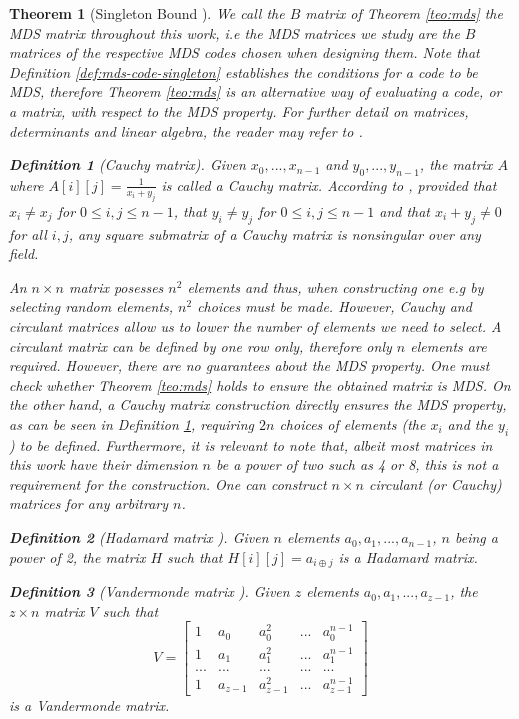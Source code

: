 \documentclass{report}
\newtheorem{definition}{Definition}{\bfseries}{\itshape}
\newtheorem{theorem}{Theorem}{\bfseries}{\itshape}
\begin{document}
\begin{theorem}[Singleton Bound \cite{SloaneBook}]
We call the $B$ matrix of Theorem \ref{teo:mds} the \emph{MDS matrix} throughout this work, i.e the MDS matrices we study are the $B$ matrices of the respective MDS codes chosen when designing them.
Note that Definition \ref{def:mds-code-singleton} establishes the conditions for a code to be MDS, therefore Theorem \ref{teo:mds} is an alternative way of evaluating a code, or a matrix, with respect to the MDS property.
For further detail on matrices, determinants and linear algebra, the reader may refer to \cite{LangeLinearAlgebra}.

\begin{definition}[Cauchy matrix]\label{def:cauchy}
Given $x_0, ..., x_{n-1}$ and $y_0, ..., y_{n-1}$, the matrix $A$ where $A[i][j] = \frac{1}{x_i + y_j}$ is called a Cauchy matrix. According to \cite{Youssef1997}, provided that $x_i \neq x_j$ for $0\leq i,j\leq n-1$, that $y_i \neq y_j$ for $0\leq i,j\leq n-1$ and that $x_i + y_j \neq 0$ for all $i, j$, any square submatrix of a Cauchy matrix is nonsingular over any field.
\end{definition}

An $n\times n$ matrix posesses $n^2$ elements and thus, when constructing one e.g by selecting random elements, $n^2$ choices must be made. However, Cauchy and circulant matrices allow us to lower the number of elements we need to select. A circulant matrix can be defined by one row only, therefore only $n$ elements are required. However, there are no guarantees about the MDS property. One must check whether Theorem \ref{teo:mds} holds to ensure the obtained matrix is MDS. On the other hand, a Cauchy matrix construction directly ensures the MDS property, as can be seen in Definition \ref{def:cauchy}, requiring $2n$ choices of elements (the $x_i$ and the $y_i$) to be defined. Furthermore, it is relevant to note that, albeit most matrices in this work have their dimension $n$ be a power of two such as 4 or 8, this is not a requirement for the construction. One can construct $n \times n$ circulant (or Cauchy) matrices for any arbitrary $n$.

\begin{definition}[Hadamard matrix \cite{beauchamp1975walsh}]
Given $n$ elements $a_0, a_1, ..., a_{n-1}$, $n$ being a power of 2, the matrix $H$ such that $H[i][j] = a_{i \oplus j}$ is a Hadamard matrix.
\end{definition}

\begin{definition}[Vandermonde matrix \cite{hoffmann1971linear}]
Given $z$ elements $a_0, a_1, ..., a_{z-1}$, the $z \times n$ matrix $V$ such that
\begin{equation}\label{eq:cost}
V = 
\begin{bmatrix}
1 & a_0 & a_0^2 & ... & a_0^{n-1}\\
1 & a_1 & a_1^2 & ... & a_1^{n-1}\\
... & ... & ... & ... & ...\\
1 & a_{z-1} & a_{z-1}^2 & ... & a_{z-1}^{n-1}
\end{bmatrix}
\end{equation}
is a Vandermonde matrix.
\end{definition}


\end{theorem}
\end{document}
